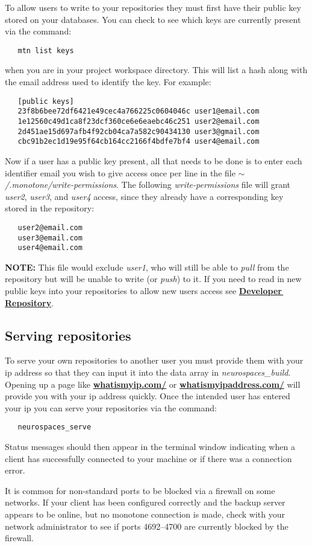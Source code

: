 \documentclass[12pt]{article}
\begin{document}
To allow users to write to your repositories they must first have their public key stored on your databases. You can check to see which keys are currently present via the command:
\begin{verbatim}
   mtn list keys
\end{verbatim}
when you are in your project workspace directory. This will list a hash along with the email address used to identify the key. For example:
\begin{verbatim}
   [public keys]
   23f8b6bee72df6421e49cec4a766225c0604046c user1@email.com
   1e12560c49d1ca8f23dcf360ce6e6eaebc46c251 user2@email.com
   2d451ae15d697afb4f92cb04ca7a582c90434130 user3@gmail.com
   cbc91b2ec1d19e95f64cb164cc2166f4bdfe7bf4 user4@email.com
\end{verbatim}
Now if a user has a public key present, all that needs to be done is to enter each identifier email you wish to give access once per line in the file {\it $\sim$/.monotone/write-permissions}. The following {\it write-permissions} file will grant {\it user2}, {\it user3}, and {\it user4} access, since they already have a corresponding key stored in the repository:
\begin{verbatim}
   user2@email.com
   user3@email.com
   user4@email.com
\end{verbatim}
{\bf NOTE:} This file would exclude {\it user1}, who will still be able to {\it pull} from the repository but will be unable to write (or {\it push}) to it.
If you need to read in new public keys into your repositories to allow new users access see \href{../developer-repository/developer-repository.tex}{\bf Developer\,Repository}.

\subsection*{Serving repositories}

To serve your own repositories to another user you must provide them with your ip address so that they can input it into the data array in {\it neurospaces\_build}. Opening up a page like \href{http://whatismyip.com/}{\bf whatismyip.com/} or \href{http://whatismyipaddress.com/}{\bf whatismyipaddress.com/} will provide you with your ip address quickly. Once the intended user has entered your ip you can serve your repositories via the command:
\begin{verbatim}
   neurospaces_serve
\end{verbatim}
Status messages should then appear in the terminal window indicating when a client has successfully connected to your machine or if there was a connection error.

It is common for non-standard ports to be blocked via a firewall on some networks. If your client has been configured correctly and the backup server appears to be online, but no monotone connection is made, check with your network administrator to see if ports 4692--4700 are currently blocked by the firewall. 
\end{document}
